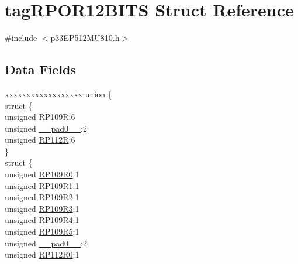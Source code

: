 \hypertarget{structtag_r_p_o_r12_b_i_t_s}{}\section{tag\+R\+P\+O\+R12\+B\+I\+TS Struct Reference}
\label{structtag_r_p_o_r12_b_i_t_s}


{\ttfamily \#include $<$p33\+E\+P512\+M\+U810.\+h$>$}

\subsection*{Data Fields}
\begin{DoxyCompactItemize}
\item 
\begin{tabbing}
xx\=xx\=xx\=xx\=xx\=xx\=xx\=xx\=xx\=\kill
union \{\\
\>struct \{\\
\>\>unsigned \hyperlink{structtag_r_p_o_r12_b_i_t_s_ac8115d9adf574da8d11478fbb3921346}{RP109R}:6\\
\>\>unsigned \hyperlink{structtag_r_p_o_r12_b_i_t_s_adf71f3d8410c1f1dbbc96680a92c49af}{\_\_pad0\_\_}:2\\
\>\>unsigned \hyperlink{structtag_r_p_o_r12_b_i_t_s_ae279cdc4bc78b2c4b06826a802f209b9}{RP112R}:6\\
\>\} \\
\>struct \{\\
\>\>unsigned \hyperlink{structtag_r_p_o_r12_b_i_t_s_a53c0b93860166db93e7c7e85e5d39546}{RP109R0}:1\\
\>\>unsigned \hyperlink{structtag_r_p_o_r12_b_i_t_s_a4f94f947d8dcddff1f5fceec210193a9}{RP109R1}:1\\
\>\>unsigned \hyperlink{structtag_r_p_o_r12_b_i_t_s_a9d23e484b157b30dedcdd0a55a2c069c}{RP109R2}:1\\
\>\>unsigned \hyperlink{structtag_r_p_o_r12_b_i_t_s_a5e8d50344d05d9575ebb613890338bd9}{RP109R3}:1\\
\>\>unsigned \hyperlink{structtag_r_p_o_r12_b_i_t_s_aac7a629a317299ed603df7fee5eaa531}{RP109R4}:1\\
\>\>unsigned \hyperlink{structtag_r_p_o_r12_b_i_t_s_afa5eef51e88bbb1973685225758a22ed}{RP109R5}:1\\
\>\>unsigned \hyperlink{structtag_r_p_o_r12_b_i_t_s_adf71f3d8410c1f1dbbc96680a92c49af}{\_\_pad0\_\_}:2\\
\>\>unsigned \hyperlink{structtag_r_p_o_r12_b_i_t_s_ab86b40cee0b9d93ed418318afa24dd99}{RP112R0}:1\\

\end{tabbing}
\end{DoxyCompactItemize}
